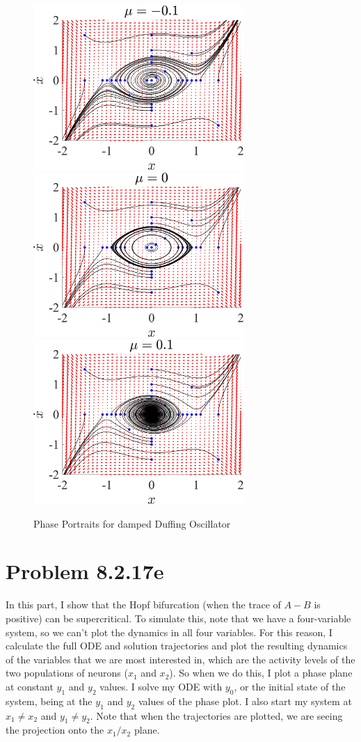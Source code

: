 \documentclass[11pt]{article}
\begin{document}
\begin{figure}[h]
\centering
\includegraphics[width=8cm]{PhasePlot_8211_-0.1.png}
\includegraphics[width=8cm]{PhasePlot_8211_0.png}
\includegraphics[width=8cm]{PhasePlot_8211_0.1.png}
\caption{Phase Portraits for damped Duffing Oscillator}
\end{figure}


\section*{Problem 8.2.17e}
In this part, I show that the Hopf bifurcation (when the trace of $A - B$ is positive) can be supercritical. To simulate this, note that we have a four-variable system, so we can't plot the dynamics in all four variables. For this reason, I calculate the full ODE and solution trajectories and plot the resulting dynamics of the variables that we are most interested in, which are the activity levels of the two populations of neurons ($x_1$ and $x_2$). So when we do this, I plot a phase plane at constant $y_1$ and $y_2$ values. I solve my ODE with $y_0$, or the initial state of the system, being at the $y_1$ and $y_2$ values of the phase plot. I also start my system at $x_1 \neq x_2$ and $y_1 \neq y_2$. Note that when the trajectories are plotted, we are seeing the projection onto the $x_1/x_2$ plane.
\end{document}
